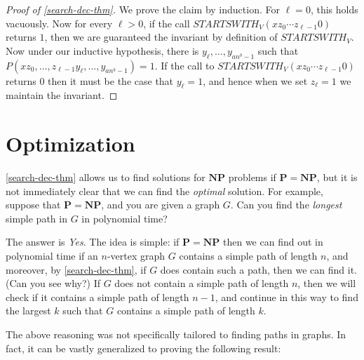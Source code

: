 \begin{proof}[Proof of \cref{search-dec-thm}]
We prove the claim by induction. For \(\ell=0\), this holds vacuously.
Now for every \(\ell > 0\), if the call
\(\ensuremath{\mathit{STARTSWITH}}_V(xz_0\cdots z_{\ell-1}0)\) returns
\(1\), then we are guaranteed the invariant by definition of
\(\ensuremath{\mathit{STARTSWITH}}_V\). Now under our inductive
hypothesis, there is \(y_\ell,\ldots,y_{an^b-1}\) such that
\(P(xz_0,\ldots,z_{\ell-1}y_\ell,\ldots,y_{an^b-1})=1\). If the call to
\(\ensuremath{\mathit{STARTSWITH}}_V(xz_0\cdots z_{\ell-1}0)\) returns
\(0\) then it must be the case that \(y_\ell=1\), and hence when we set
\(z_\ell=1\) we maintain the invariant.

\end{proof}

\section{Optimization}\label{optimizationsection}

\cref{search-dec-thm} allows us to find solutions for \(\mathbf{NP}\)
problems if \(\mathbf{P}=\mathbf{NP}\), but it is not immediately clear
that we can find the \emph{optimal} solution. For example, suppose that
\(\mathbf{P}=\mathbf{NP}\), and you are given a graph \(G\). Can you
find the \emph{longest} simple path in \(G\) in polynomial time?


The answer is \emph{Yes}. The idea is simple: if
\(\mathbf{P}=\mathbf{NP}\) then we can find out in polynomial time if an
\(n\)-vertex graph \(G\) contains a simple path of length \(n\), and
moreover, by \cref{search-dec-thm}, if \(G\) does contain such a path,
then we can find it. (Can you see why?) If \(G\) does not contain a
simple path of length \(n\), then we will check if it contains a simple
path of length \(n-1\), and continue in this way to find the largest
\(k\) such that \(G\) contains a simple path of length \(k\).

The above reasoning was not specifically tailored to finding paths in
graphs. In fact, it can be vastly generalized to proving the following
result:

